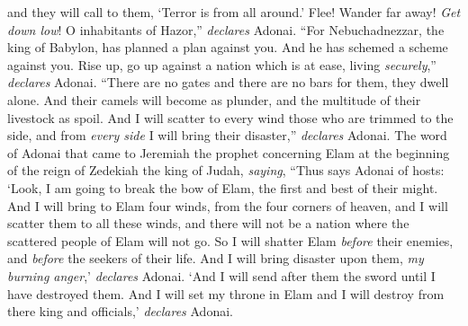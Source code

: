 \begin{biblechapter}
and they will call to them, ‘Terror is from all around.’
\verse Flee! Wander far away! \textit{Get down low}! 
O inhabitants of Hazor,” \textit{declares} Adonai. 
“For Nebuchadnezzar, the king of Babylon, has planned a plan against you. 
And he has schemed a scheme against you.
\verse Rise up, go up against a nation which is at ease, 
living \textit{securely},” \textit{declares} Adonai. 
“There are no gates and there are no bars for them, 
they dwell alone.
\verse And their camels will become as plunder, 
and the multitude of their livestock as spoil. 
And I will scatter to every wind those who are trimmed to the side, 
and from \textit{every side} I will bring their disaster,” \textit{declares} Adonai.
 The word of Adonai that came to Jeremiah the prophet concerning Elam at the beginning of the reign of Zedekiah the king of Judah, \textit{saying},
\verse “Thus says Adonai of hosts:
\verse ‘Look, I am going to break the bow of Elam, 
the first and best of their might.
\verse And I will bring to Elam four winds, 
from the four corners of heaven, 
and I will scatter them to all these winds, 
and there will not be a nation 
where the scattered people of Elam will not go.
\verse So I will shatter Elam \textit{before} their enemies, 
and \textit{before} the seekers of their life. 
And I will bring disaster upon them, 
\textit{my burning anger},’ \textit{declares} Adonai. 
‘And I will send after them the sword 
until I have destroyed them.
\verse And I will set my throne in Elam 
and I will destroy from there king and officials,’ \textit{declares} Adonai.
\end{biblechapter}

